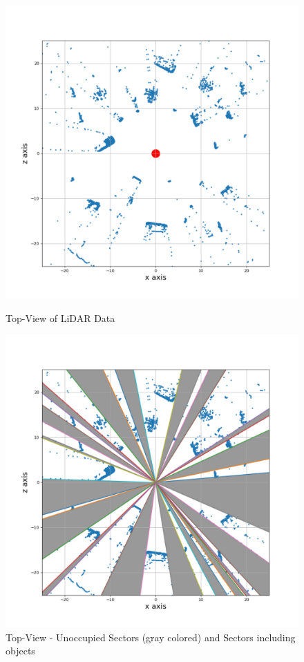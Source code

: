 \begin{figure}[!h]
\centering
\begin{minipage}{0.44\textwidth}
  \centering
         \includegraphics[scale=0.445]{./images/sector-transforms/scene-with-centre.pdf}
       \caption{Top-View of LiDAR Data}
       \label{fig:sectors1}
\end{minipage}%
\begin{minipage}{0.44\textwidth}
  \centering
        \includegraphics[scale=0.448]{./images/sector-transforms/scene-with-sector.pdf}
        \caption{Top-View - Unoccupied Sectors (gray colored) and  Sectors including objects}
        \label{fig:sectors2}
\end{minipage}%
\end{figure}









